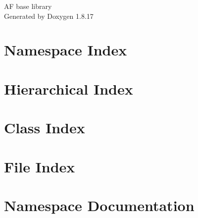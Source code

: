 \let\mypdfximage\pdfximage\def\pdfximage{\immediate\mypdfximage}\documentclass[twoside]{book}
\newcommand{\+}{\discretionary{\mbox{\scriptsize$\hookleftarrow$}}{}{}}
\newcommand{\clearemptydoublepage}{%
  \newpage{\pagestyle{empty}\cleardoublepage}%
}
\begin{document}
\hypersetup{pageanchor=false,
             bookmarksnumbered=true,
             pdfencoding=unicode
            }
\begin{titlepage}
\vspace*{7cm}
\begin{center}%
{\Large AF base library }\\
\vspace*{1cm}
{\large Generated by Doxygen 1.8.17}\\
\end{center}
\end{titlepage}
\clearemptydoublepage
{}
\tableofcontents
\clearemptydoublepage
{}
\hypersetup{pageanchor=true}

\chapter{Namespace Index}

\chapter{Hierarchical Index}

\chapter{Class Index}

\chapter{File Index}

\chapter{Namespace Documentation}







\end{document}
